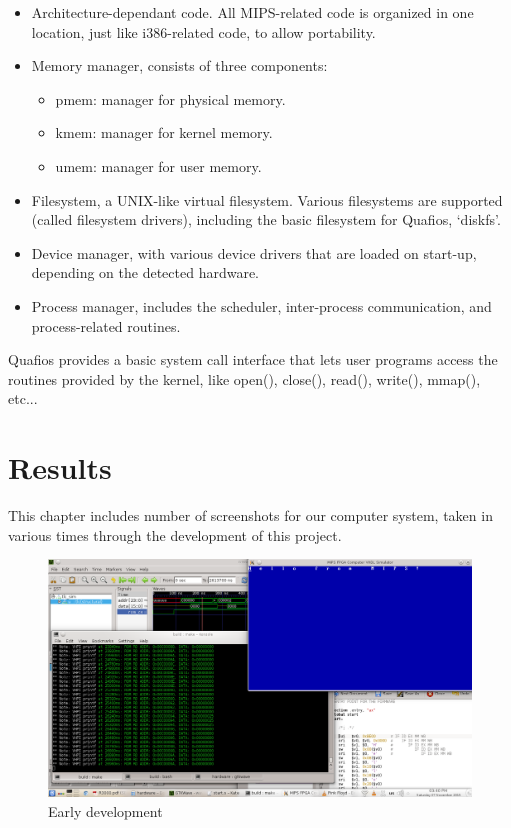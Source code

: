 \documentclass[oneside]{book}
\begin{document}
\begin{itemize}

\item Architecture-dependant code. All MIPS-related code is organized
      in one location, just like i386-related code, to allow portability.
\item Memory manager, consists of three components:
      \begin{itemize}
      \item pmem: manager for physical memory.
      \item kmem: manager for kernel memory.
      \item umem: manager for user memory.
      \end{itemize}
\item Filesystem, a UNIX-like virtual filesystem. Various filesystems
      are supported (called filesystem drivers), including the basic
      filesystem for Quafios, `diskfs'.
\item Device manager, with various device drivers that are loaded on
      start-up, depending on the detected hardware.
\item Process manager, includes the scheduler, inter-process communication,
      and process-related routines.
\end{itemize}

Quafios provides a basic system call interface that lets user programs access
the routines provided by the kernel, like open(), close(), read(), write(),
mmap(), etc...


\chapter{Results}

This chapter includes number of screenshots for our
computer system, taken in various times through the development of
this project.

\begin{figure}
\begin{center}
\includegraphics[width=20cm]{res_devel.png}
\end{center}
\caption{Early development}
\end{figure}
\end{document}
